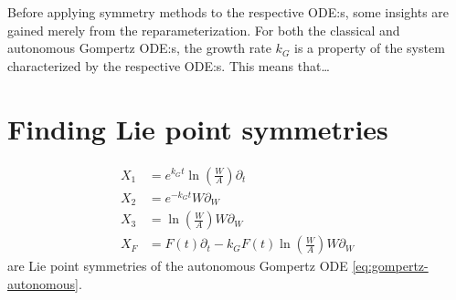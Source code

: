 Before applying symmetry methods to the respective ODE:s, some insights are gained merely from the reparameterization.
For both the classical and autonomous Gompertz ODE:s, the growth rate \(k_G\) is a property of the system characterized by the respective ODE:s.
This means that\dots%


\section{Finding Lie point symmetries}

\begin{align}
  X_1 &= e^{k_G t} \ln(\frac{W}{A}) \partial_t \\
  X_2 &= e^{-k_G t} W \partial_W \\
  X_3 &= \ln(\frac{W}{A}) W \partial_W \\
  X_F &= F(t) \partial_t - k_G F(t) \ln(\frac{W}{A}) W \partial_W
\end{align}
are Lie point symmetries of the autonomous Gompertz ODE \ref{eq:gompertz-autonomous}.

